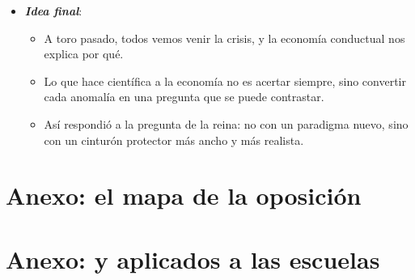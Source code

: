 \documentclass[11pt]{article}
\begin{document}
\begin{itemize}
\begin{itemize}
  \item Cada modelo simplifica para responder a una pregunta. Lo sensato es el pluralismo: muchos modelos y el oficio de elegir el que conviene a cada caso\nocite{Rodrik2015Rules}.

  \item La historia del método lo confirma: las ideas abandonadas vuelven cuando cambian las preguntas, como la racionalidad limitada de  o los equilibrios múltiples tras la crisis\nocite{Roncaglia2006Riqueza}.
  \end{itemize}
\item \textbf{\emph{Idea final}}:
  \begin{itemize}
  \item A toro pasado, todos vemos venir la crisis, y la economía conductual nos explica por qué.

  \item Lo que hace científica a la economía no es acertar siempre, sino convertir cada anomalía en una pregunta que se puede contrastar.

  \item Así respondió a la pregunta de la reina: no con un paradigma nuevo, sino con un cinturón protector más ancho y más realista.
  \end{itemize}
\end{itemize}

\clearpage
\appendix

\section{Anexo: el mapa de la oposición}\label{anexo:mapa}

\begin{infografia}[H]
\centering
\caption{El mapa de la oposición: las ramas de la economía y los bloques del temario}\label{figu:mapa-temario}
\end{infografia}


\section{Anexo:  y  aplicados a las escuelas}\label{anexo:kuhn-lakatos}
\end{document}
